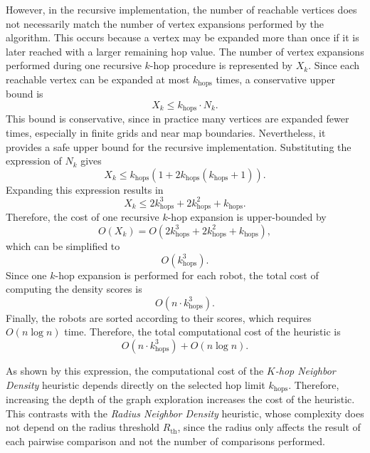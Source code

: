 However, in the recursive implementation, the number of reachable vertices does not necessarily match the number of vertex expansions performed by the algorithm. This occurs because a vertex may be expanded more than once if it is later reached with a larger remaining hop value. The number of vertex expansions performed during one recursive $k$-hop procedure is represented by $X_k$. Since each reachable vertex can be expanded at most $k_{\text{hops}}$ times, a conservative upper bound is
\begin{equation}
    X_k \leq k_{\text{hops}} \cdot N_k.
\end{equation}
This bound is conservative, since in practice many vertices are expanded fewer times, especially in finite grids and near map boundaries. Nevertheless, it provides a safe upper bound for the recursive implementation.
Substituting the expression of $N_k$ gives
\begin{equation}
    X_k \leq
    k_{\text{hops}}
    \left(1 + 2k_{\text{hops}}(k_{\text{hops}}+1)\right).
\end{equation}
Expanding this expression results in
\begin{equation}
    X_k \leq
    2k_{\text{hops}}^3
    + 2k_{\text{hops}}^2
    + k_{\text{hops}}.
\end{equation}
Therefore, the cost of one recursive $k$-hop expansion is upper-bounded by
\begin{equation}
    O(X_k)
    =
    O\left(2k_{\text{hops}}^3 + 2k_{\text{hops}}^2 + k_{\text{hops}}\right),
\end{equation}
which can be simplified to
\begin{equation}
    O(k_{\text{hops}}^3).
\end{equation}
Since one $k$-hop expansion is performed for each robot, the total cost of computing the density scores is
\begin{equation}
    O(n \cdot k_{\text{hops}}^3).
\end{equation}
Finally, the robots are sorted according to their scores, which requires $O(n \log n)$ time. Therefore, the total computational cost of the heuristic is
\begin{equation}
\label{eq:k_hop_neighbor_density_complexity}
    O(n \cdot k_{\text{hops}}^3) + O(n \log n).
\end{equation}


As shown by this expression, the computational cost of the \textit{\(K\)-hop Neighbor Density} heuristic depends directly on the selected hop limit \(k_{\text{hops}}\). Therefore, increasing the depth of the graph exploration increases the cost of the heuristic. This contrasts with the \textit{Radius Neighbor Density} heuristic, whose complexity does not depend on the radius threshold \(R_{\text{th}}\), since the radius only affects the result of each pairwise comparison and not the number of comparisons performed.

